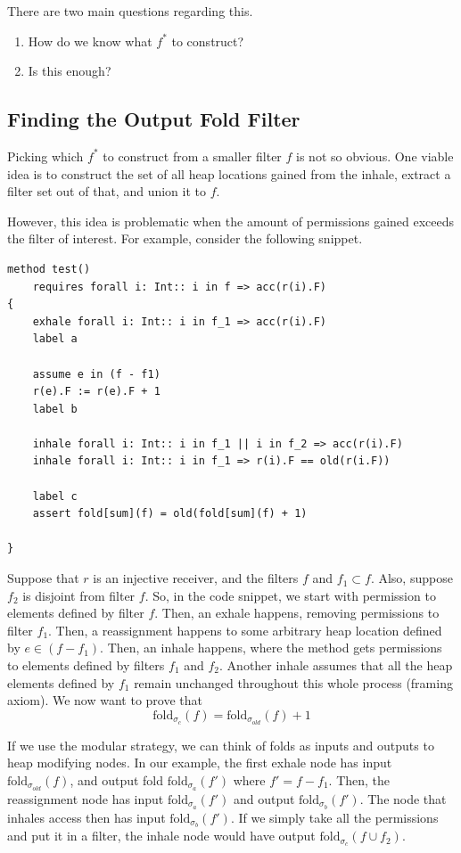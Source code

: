 \documentclass[msc,oneside]{ubcthesis}
\theoremstyle{definition}
\begin{document}
There are two main questions regarding this.
\begin{enumerate}
    \item How do we know what $f^*$ to construct?
    \item Is this enough?
\end{enumerate}

\subsection{Finding the Output Fold Filter}
Picking which $f^*$ to construct from a smaller filter $f$ is not so obvious. One viable idea is to construct the set of all heap locations gained from the inhale, extract a filter set out of that, and union it to $f$. 

However, this idea is problematic when the amount of permissions gained exceeds the filter of interest. For example, consider the following snippet.
\begin{lstlisting}
method test()
    requires forall i: Int:: i in f => acc(r(i).F)
{
    exhale forall i: Int:: i in f_1 => acc(r(i).F)
    label a
    
    assume e in (f - f1)
    r(e).F := r(e).F + 1
    label b
    
    inhale forall i: Int:: i in f_1 || i in f_2 => acc(r(i).F) 
    inhale forall i: Int:: i in f_1 => r(i).F == old(r(i.F))
            
    label c
    assert fold[sum](f) = old(fold[sum](f) + 1)

}
\end{lstlisting}
Suppose that $r$ is an injective receiver, and the filters $f$ and $f_1 \subset f$. Also, suppose $f_2$ is disjoint from filter $f$. So, in the code snippet, we start with permission to elements defined by filter $f$. Then, an exhale happens, removing permissions to filter $f_1$. Then, a reassignment happens to some arbitrary heap location defined by $e \in (f - f_1)$. Then, an inhale happens, where the method gets permissions to elements defined by filters $f_1$ and $f_2$. Another inhale assumes that all the heap elements defined by $f_1$ remain unchanged throughout this whole process (framing axiom). We now want to prove that 
$$\textrm{fold}_{\sigma_{c}}(f) = \textrm{fold}_{\sigma_{old}}(f) + 1$$

If we use the modular strategy, we can think of folds as inputs and outputs to heap modifying nodes. In our example, the first exhale node has input $\textrm{fold}_{\sigma_{old}}(f)$, and output fold $\textrm{fold}_{\sigma_{a}}(f')$ where $f' = f - f_1$. Then, the reassignment node has input 
$\textrm{fold}_{\sigma_{a}}(f')$ and output $\textrm{fold}_{\sigma_{b}}(f')$.
The node that inhales access then has input $\textrm{fold}_{\sigma_{b}}(f')$. If we simply take all the permissions and put it in a filter, the inhale node would have output $\textrm{fold}_{\sigma_{c}}(f \cup f_2 ).$
\end{document}
